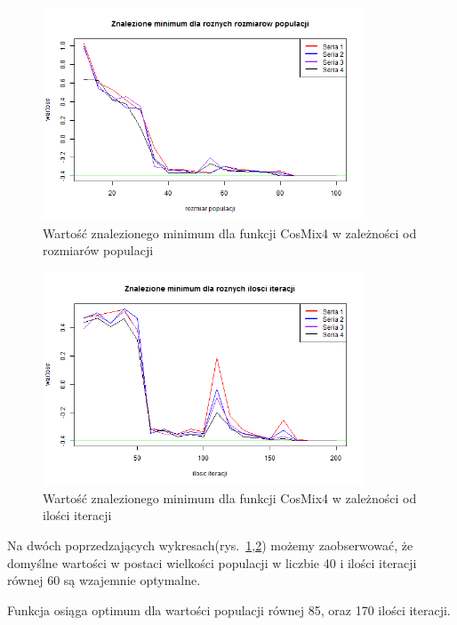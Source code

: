 \documentclass[11pt, a4paper]{article}
\newcommand{\fbi}{\leavevmode{\parindent=1em\indent}}
\begin{document}
\begin{figure}[H]
	\begin{center}
		\includegraphics[width=0.85\textwidth]{./assets/CosMix44.png}
		\caption{Wartość znalezionego minimum dla funkcji CosMix4 w zależności od rozmiarów populacji}
		\label{fig:cosmix44}
	\end{center}
\end{figure}

\begin{figure}[H]
	\begin{center}
		\includegraphics[width=0.85\textwidth]{./assets/CosMix45.png}
		\caption{Wartość znalezionego minimum dla funkcji CosMix4 w zależności od ilości iteracji}
		\label{fig:cosmix45}
	\end{center}
\end{figure}

\fbi
Na dwóch poprzedzających wykresach(rys.~\ref{fig:cosmix44},\ref{fig:cosmix45}) możemy zaobserwować, że domyślne wartości w postaci wielkości populacji w liczbie 40 i ilości iteracji równej 60 są wzajemnie optymalne.

\fbi
Funkcja osiąga optimum dla wartości populacji równej 85, oraz 170 ilości iteracji.
\end{document}

